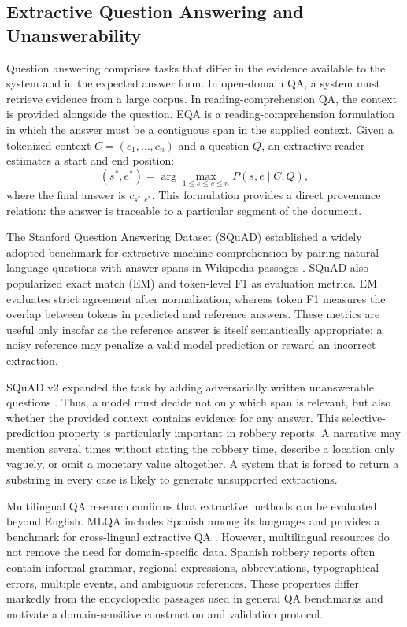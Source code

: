 \documentclass[graybox]{SNmult}
\begin{document}
\subsection{Extractive Question Answering and Unanswerability}

Question answering comprises tasks that differ in the evidence available to the system and in the expected answer form. In open-domain QA, a system must retrieve evidence from a large corpus. In reading-comprehension QA, the context is provided alongside the question. EQA is a reading-comprehension formulation in which the answer must be a contiguous span in the supplied context. Given a tokenized context $C=(c_1,\ldots,c_n)$ and a question $Q$, an extractive reader estimates a start and end position:
\begin{equation}
(s^*,e^*) = \arg\max_{1 \leq s \leq e \leq n} P(s,e\mid C,Q),
\label{eq:eqa}
\end{equation}
where the final answer is $c_{s^*:e^*}$. This formulation provides a direct provenance relation: the answer is traceable to a particular segment of the document.

The Stanford Question Answering Dataset (SQuAD) established a widely adopted benchmark for extractive machine comprehension by pairing natural-language questions with answer spans in Wikipedia passages \cite{rajpurkar2016squad}. SQuAD also popularized exact match (EM) and token-level F1 as evaluation metrics. EM evaluates strict agreement after normalization, whereas token F1 measures the overlap between tokens in predicted and reference answers. These metrics are useful only insofar as the reference answer is itself semantically appropriate; a noisy reference may penalize a valid model prediction or reward an incorrect extraction.

SQuAD v2 expanded the task by adding adversarially written unanswerable questions \cite{rajpurkar2018know}. Thus, a model must decide not only which span is relevant, but also whether the provided context contains evidence for any answer. This selective-prediction property is particularly important in robbery reports. A narrative may mention several times without stating the robbery time, describe a location only vaguely, or omit a monetary value altogether. A system that is forced to return a substring in every case is likely to generate unsupported extractions.

Multilingual QA research confirms that extractive methods can be evaluated beyond English. MLQA includes Spanish among its languages and provides a benchmark for cross-lingual extractive QA \cite{lewis2020mlqa}. However, multilingual resources do not remove the need for domain-specific data. Spanish robbery reports often contain informal grammar, regional expressions, abbreviations, typographical errors, multiple events, and ambiguous references. These properties differ markedly from the encyclopedic passages used in general QA benchmarks and motivate a domain-sensitive construction and validation protocol.
\end{document}
